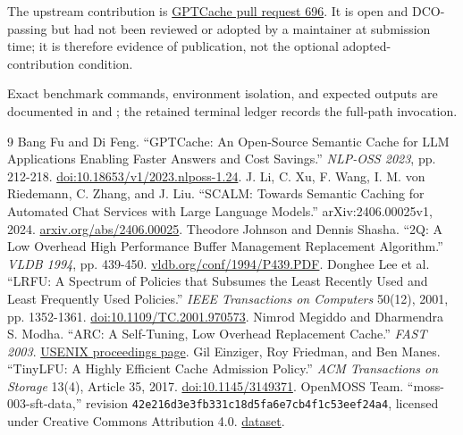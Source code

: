 \documentclass[10pt,letterpaper]{article}
\newcommand{\code}[1]{\texttt{#1}}
\begin{document}
The upstream contribution is
\href{https://github.com/zilliztech/GPTCache/pull/696}{GPTCache pull request
696}. It is open and DCO-passing but had not been reviewed or adopted by a
maintainer at submission time; it is therefore evidence of publication, not
the optional adopted-contribution condition.

Exact benchmark commands, environment isolation, and expected outputs are
documented in  and
; the retained terminal ledger records
the full-path invocation.

\begin{thebibliography}{9}
Bang Fu and Di Feng. ``GPTCache: An Open-Source Semantic Cache for LLM Applications
Enabling Faster Answers and Cost Savings.'' \emph{NLP-OSS 2023}, pp. 212-218.
\href{https://doi.org/10.18653/v1/2023.nlposs-1.24}{doi:10.18653/v1/2023.nlposs-1.24}.
J. Li, C. Xu, F. Wang, I. M. von Riedemann, C. Zhang, and J. Liu.
``SCALM: Towards Semantic Caching for Automated Chat Services with Large
Language Models.'' arXiv:2406.00025v1, 2024.
\href{https://arxiv.org/abs/2406.00025}{arxiv.org/abs/2406.00025}.
Theodore Johnson and Dennis Shasha. ``2Q: A Low Overhead High Performance
Buffer Management Replacement Algorithm.'' \emph{VLDB 1994}, pp. 439-450.
\href{https://www.vldb.org/conf/1994/P439.PDF}{vldb.org/conf/1994/P439.PDF}.
Donghee Lee et al. ``LRFU: A Spectrum of Policies that Subsumes the Least
Recently Used and Least Frequently Used Policies.'' \emph{IEEE Transactions
on Computers} 50(12), 2001, pp. 1352-1361.
\href{https://doi.org/10.1109/TC.2001.970573}{doi:10.1109/TC.2001.970573}.
Nimrod Megiddo and Dharmendra S. Modha. ``ARC: A Self-Tuning, Low Overhead
Replacement Cache.'' \emph{FAST 2003}.
\href{https://www.usenix.org/conference/fast-03/presentation/arc-self-tuning-low-overhead-replacement-cache}{USENIX proceedings page}.
Gil Einziger, Roy Friedman, and Ben Manes. ``TinyLFU: A Highly Efficient Cache
Admission Policy.'' \emph{ACM Transactions on Storage} 13(4), Article 35,
2017. \href{https://doi.org/10.1145/3149371}{doi:10.1145/3149371}.
OpenMOSS Team. ``moss-003-sft-data,'' revision
\code{42e216d3e3fb331c18d5fa6e7cb4f1c53eef24a4}, licensed under Creative
Commons Attribution 4.0.
\href{https://huggingface.co/datasets/OpenMOSS-Team/moss-003-sft-data}{dataset}.
\end{thebibliography}
\end{document}
